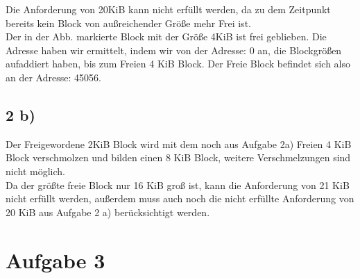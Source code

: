 \documentclass{ti2}
\begin{document}
Die Anforderung von 20KiB kann nicht erfüllt werden, da zu dem Zeitpunkt bereits kein Block von außreichender Größe mehr Frei ist.\\

Der in der Abb. markierte Block mit der Größe 4KiB ist frei geblieben.
Die Adresse haben wir ermittelt, indem wir von der Adresse: 0 an, die Blockgrößen aufaddiert haben, bis zum Freien 4 KiB Block.
Der Freie Block befindet sich also an der Adresse: 45056.



\subsection*{2 b)}




Der Freigewordene 2KiB Block wird mit dem noch aus Aufgabe 2a) Freien 4 KiB Block verschmolzen und bilden einen 8 KiB Block, weitere Verschmelzungen sind nicht möglich.\\

Da der größte freie Block nur 16 KiB groß ist, kann die Anforderung von 21 KiB nicht erfüllt werden, außerdem muss auch noch die nicht erfüllte Anforderung von 20 KiB aus Aufgabe 2 a) berücksichtigt werden.\\

\section*{Aufgabe 3}
\end{document}
